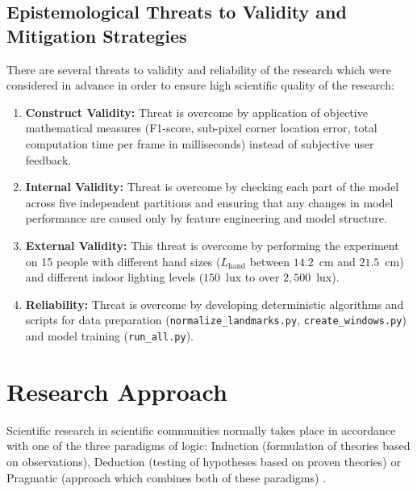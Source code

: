 \subsection{Epistemological Threats to Validity and Mitigation Strategies}
\label{subsec:meth_threats_validity}
There are several threats to validity and reliability of the research which were considered in advance in order to ensure high scientific quality of the research:
\begin{enumerate}
    \item \textbf{Construct Validity:} Threat is overcome by application of objective mathematical measures (F1-score, sub-pixel corner location error, total computation time per frame in milliseconds) instead of subjective user feedback.
    \item \textbf{Internal Validity:} Threat is overcome by checking each part of the model across five independent partitions and ensuring that any changes in model performance are caused only by feature engineering and model structure.
    \item \textbf{External Validity:} This threat is overcome by performing the experiment on 15 people with different hand sizes ($L_{\text{hand}}$ between $14.2$~cm and $21.5$~cm) and different indoor lighting levels ($150$~lux to over $2,500$~lux).
    \item \textbf{Reliability:} Threat is overcome by developing deterministic algorithms and scripts for data preparation (\texttt{normalize\_landmarks.py}, \texttt{create\_windows.py}) and model training (\texttt{run\_all.py}).
\end{enumerate}

\section{Research Approach}
\label{sec:meth_approach}
Scientific research in scientific communities normally takes place in accordance with one of the three paradigms of logic: Induction (formulation of theories based on observations), Deduction (testing of hypotheses based on proven theories) or Pragmatic (approach which combines both of these paradigms) \cite{Cui2020Deep}.

